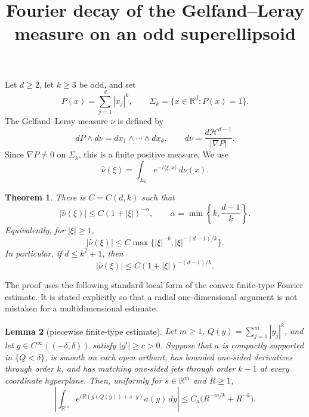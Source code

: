 \documentclass[11pt]{amsart}
\title{Fourier decay of the Gelfand--Leray measure on an odd superellipsoid}
\author{}\date{}
\newtheorem{theorem}{Theorem}
\newtheorem{lemma}[theorem]{Lemma}
\begin{document}
\maketitle

Let \(d\ge2\), let \(k\ge3\) be odd, and set
\[
P(x)=\sum_{j=1}^d|x_j|^k,\qquad
\Sigma_k=\{x\in\mathbb R^d:P(x)=1\}.
\]
The Gelfand--Leray measure \(\nu\) is defined by
\begin{equation}\label{eq:GL}
dP\wedge d\nu=dx_1\wedge\cdots\wedge dx_d,\qquad
d\nu=\frac{d\mathcal H^{d-1}}{|\nabla P|}.
\end{equation}
Since \(\nabla P\ne0\) on \(\Sigma_k\), this is a finite positive measure.
We use
\[
\widehat\nu(\xi)=\int_{\Sigma_k}e^{-i\langle\xi,x\rangle}\,d\nu(x).
\]

\begin{theorem}\label{thm:main}
There is \(C=C(d,k)\) such that
\begin{equation}\label{eq:main}
|\widehat\nu(\xi)|\le C(1+|\xi|)^{-\alpha},\qquad
\alpha=\min\left\{k,\frac{d-1}{k}\right\}.
\end{equation}
Equivalently, for \(|\xi|\ge1\),
\[
|\widehat\nu(\xi)|
\le C\max\bigl\{|\xi|^{-k},|\xi|^{-(d-1)/k}\bigr\}.
\]
In particular, if \(d\le k^2+1\), then
\[
|\widehat\nu(\xi)|\le C(1+|\xi|)^{-(d-1)/k}.
\]
\end{theorem}

The proof uses the following standard local form of the convex finite-type
Fourier estimate. It is stated explicitly so that a radial one-dimensional
argument is not mistaken for a multidimensional estimate.

\begin{lemma}[piecewise finite-type estimate]\label{lem:finite-type}
Let \(m\ge1\), \(Q(y)=\sum_{j=1}^m|y_j|^k\), and let
\(g\in C^\infty((-\delta,\delta))\) satisfy \(|g'|\ge c>0\).
Suppose that \(a\) is compactly supported in \(\{Q<\delta\}\), is smooth on
each open orthant, has bounded one-sided derivatives through order \(k\),
and has matching one-sided jets through order \(k-1\) at every coordinate
hyperplane. Then, uniformly for \(s\in\mathbb R^m\) and \(R\ge1\),
\begin{equation}\label{eq:FT-lemma}
\left|\int_{\mathbb R^m}e^{iR(g(Q(y))+s\cdot y)}a(y)\,dy\right|
\le C_a\bigl(R^{-m/k}+R^{-k}\bigr).
\end{equation}
\end{lemma}
\end{document}
